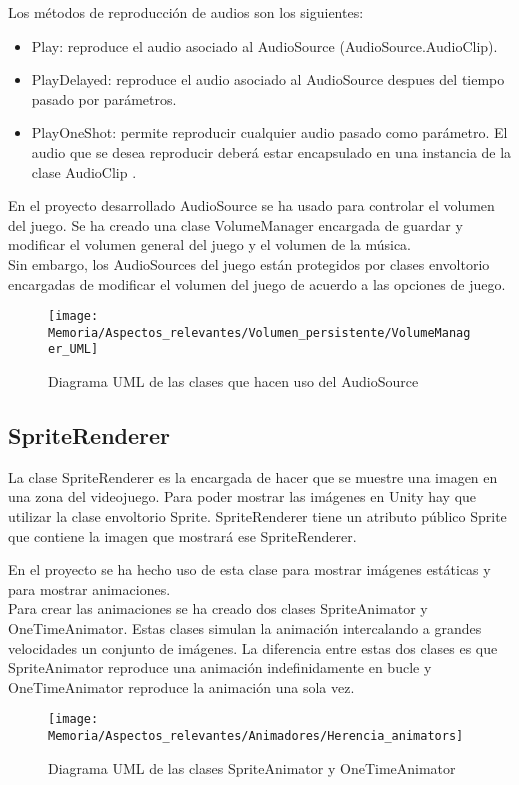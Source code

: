 Los métodos de reproducción de audios son los siguientes:
\begin{itemize}
\item
Play: reproduce el audio asociado al AudioSource (AudioSource.AudioClip).
\item
PlayDelayed: reproduce el audio asociado al AudioSource despues del tiempo pasado por parámetros.
\item
PlayOneShot: permite reproducir cualquier audio pasado como parámetro. El audio que se desea reproducir deberá estar encapsulado en una instancia de la clase AudioClip \cite{AudioClip} .
\end{itemize}

En el proyecto desarrollado AudioSource se ha usado para controlar el volumen del juego. Se ha creado una clase VolumeManager encargada de guardar y modificar el volumen general del juego y el volumen de la música.\\
Sin embargo, los AudioSources del juego están protegidos por clases envoltorio encargadas de modificar el volumen del juego de acuerdo a las opciones de juego.

\begin{figure}[h]
\texttt{[image: Memoria/Aspectos\_relevantes/Volumen\_persistente/VolumeManager\_UML]}
\caption{Diagrama UML de las clases que hacen uso del AudioSource}
\end{figure}

\subsection{SpriteRenderer}
La clase SpriteRenderer es la encargada de hacer que se muestre una imagen en una zona del videojuego. Para poder mostrar las imágenes en Unity hay que utilizar la clase envoltorio Sprite. SpriteRenderer tiene un atributo público Sprite que contiene la imagen que mostrará ese SpriteRenderer.

En el proyecto se ha hecho uso de esta clase para mostrar imágenes estáticas y para mostrar animaciones.\\
Para crear las animaciones se ha creado dos clases SpriteAnimator y OneTimeAnimator. Estas clases simulan la animación intercalando a grandes velocidades un conjunto de imágenes. La diferencia entre estas dos clases es que SpriteAnimator reproduce una animación indefinidamente en bucle y OneTimeAnimator reproduce la animación una sola vez.

\begin{figure}[h]
\texttt{[image: Memoria/Aspectos\_relevantes/Animadores/Herencia\_animators]}
\caption{Diagrama UML de las clases SpriteAnimator y OneTimeAnimator}
\end{figure}

